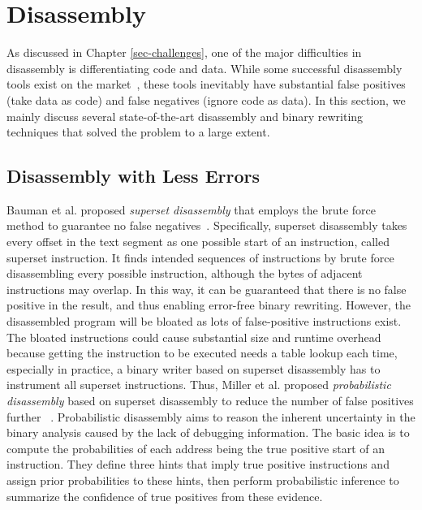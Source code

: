 \section{Disassembly} \label{sec:existing-disassembly}
As discussed in Chapter \ref{sec-challenges}, one of the major difficulties in
disassembly is differentiating code and data. While some successful disassembly
tools exist on the market~\cite{hex2014ida,kvroustek2017retdec,ghidra,radare},
these tools inevitably have substantial false positives (take data as code) and
false negatives (ignore code as data). In this section, we mainly discuss
several state-of-the-art disassembly and binary rewriting techniques that
solved the problem to a large extent.

\subsection{Disassembly with Less Errors} \label{sec:existing-less-errors}
Bauman et al. proposed \textit{superset disassembly} that employs the brute 
force method to guarantee no false negatives~\cite{bauman2018superset}. 
Specifically, superset disassembly takes every offset in the text segment as 
one possible start of an instruction, called superset instruction. It finds 
intended sequences of instructions by brute force disassembling every possible 
instruction, although the bytes of adjacent instructions may overlap.
%
In this way, it can be guaranteed that there is no false positive in the 
result, and thus enabling error-free binary rewriting. However, the 
disassembled program will be bloated as lots of false-positive instructions 
exist. The bloated instructions could cause substantial size and runtime 
overhead because getting the instruction to be executed needs a table lookup 
each time, especially in practice, a binary writer based on superset 
disassembly has to instrument all superset instructions.
Thus, Miller et al. proposed \textit{probabilistic disassembly} based on 
superset disassembly to reduce the number of false positives further
~\cite{miller2019probabilistic}. Probabilistic disassembly aims to reason the 
inherent uncertainty in the binary analysis caused by the lack of debugging 
information. The basic idea is to compute the probabilities of each address 
being the true positive start of an instruction. They define three hints that 
imply true positive instructions and assign prior probabilities to these hints, 
then perform probabilistic inference to summarize the confidence of true 
positives from these evidence.

